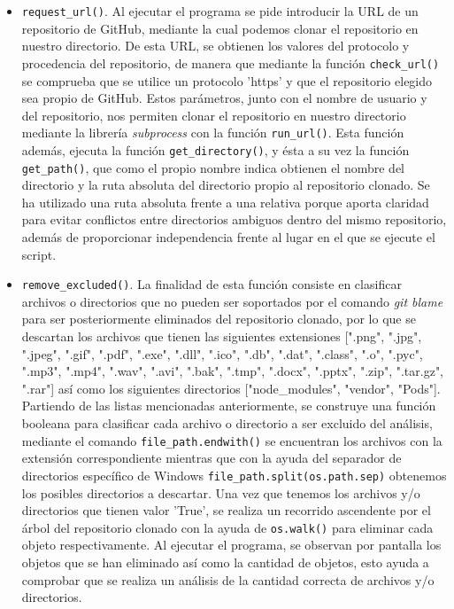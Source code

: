 \documentclass[a4paper, 12pt]{book}
\begin{document}
\begin{itemize}
  \item \texttt{request\_url()}. Al ejecutar el programa se pide introducir la URL de un repositorio de GitHub, mediante la cual podemos clonar el repositorio en nuestro directorio. De esta URL, se obtienen los valores del protocolo y procedencia del
  repositorio, de manera que mediante la función \texttt{check\_url()} se comprueba que se utilice un protocolo 'https' y que el repositorio elegido sea propio de GitHub. Estos parámetros, junto con el nombre de usuario y del repositorio, nos permiten clonar
  el repositorio en nuestro directorio mediante la librería \textit{subprocess} con la función \texttt{run\_url()}. Esta función además, ejecuta la función \texttt{get\_directory()}, y ésta a su vez la función \texttt{get\_path()}, que como el propio nombre
  indica obtienen el nombre del directorio y la ruta absoluta del directorio propio al repositorio clonado. Se ha utilizado una ruta absoluta frente a una relativa porque aporta claridad para evitar conflictos entre directorios ambiguos dentro del mismo repositorio,
  además de proporcionar independencia frente al lugar en el que se ejecute el script.

  \item \texttt{remove\_excluded()}. La finalidad de esta función consiste en clasificar archivos o directorios que no pueden ser soportados por el comando \textit{git blame} para ser posteriormente eliminados del repositorio clonado, por lo que 
  se descartan los archivos que tienen las siguientes extensiones [".png", ".jpg", ".jpeg", ".gif", ".pdf", ".exe", ".dll", ".ico", ".db", ".dat", ".class", ".o", ".pyc", ".mp3", ".mp4", ".wav", ".avi", ".bak", ".tmp", ".docx", ".pptx", ".zip",
  ".tar.gz", ".rar"] así como los siguientes directorios ["node\_modules", "vendor", "Pods"].
  \\Partiendo de las listas mencionadas anteriormente, se construye una función booleana para clasificar cada archivo o directorio a ser excluido del análisis, mediante el comando \texttt{file\_path.endwith()} se encuentran los archivos con la
  extensión correspondiente mientras que con la ayuda del separador de directorios específico de Windows \texttt{file\_path.split(os.path.sep)} obtenemos los posibles directorios a descartar. Una vez que tenemos los archivos y/o directorios que 
  tienen valor 'True', se realiza un recorrido ascendente por el árbol del repositorio clonado con la ayuda de \texttt{os.walk()} para eliminar cada objeto respectivamente. Al ejecutar el programa, se observan por pantalla los objetos que 
  se han eliminado así como la cantidad de objetos, esto ayuda a comprobar que se realiza un análisis de la cantidad correcta de archivos y/o directorios. 


\end{itemize}
\end{document}
